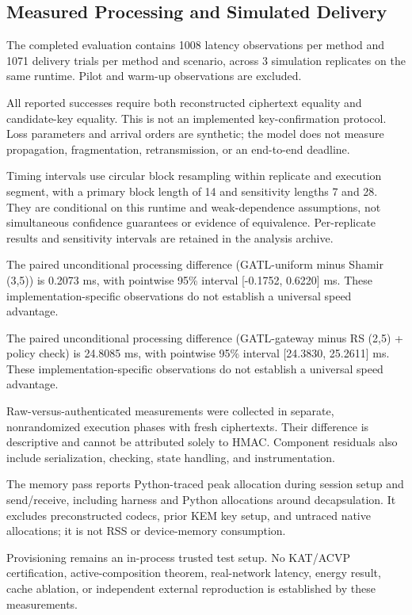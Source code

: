\subsection{Measured Processing and Simulated Delivery}

The completed evaluation contains 1008 latency observations per method and 1071 delivery trials per method and scenario, across 3 simulation replicates on the same runtime. Pilot and warm-up observations are excluded.

All reported successes require both reconstructed ciphertext equality and candidate-key equality. This is not an implemented key-confirmation protocol. Loss parameters and arrival orders are synthetic; the model does not measure propagation, fragmentation, retransmission, or an end-to-end deadline.



Timing intervals use circular block resampling within replicate and execution segment, with a primary block length of 14 and sensitivity lengths 7 and 28. They are conditional on this runtime and weak-dependence assumptions, not simultaneous confidence guarantees or evidence of equivalence. Per-replicate results and sensitivity intervals are retained in the analysis archive.

The paired unconditional processing difference (GATL-uniform minus Shamir (3,5)) is 0.2073 ms, with pointwise 95\% interval [-0.1752, 0.6220] ms. These implementation-specific observations do not establish a universal speed advantage.

The paired unconditional processing difference (GATL-gateway minus RS (2,5) + policy check) is 24.8085 ms, with pointwise 95\% interval [24.3830, 25.2611] ms. These implementation-specific observations do not establish a universal speed advantage.

Raw-versus-authenticated measurements were collected in separate, nonrandomized execution phases with fresh ciphertexts. Their difference is descriptive and cannot be attributed solely to HMAC. Component residuals also include serialization, checking, state handling, and instrumentation.

The memory pass reports Python-traced peak allocation during session setup and send/receive, including harness and Python allocations around decapsulation. It excludes preconstructed codecs, prior KEM key setup, and untraced native allocations; it is not RSS or device-memory consumption.

Provisioning remains an in-process trusted test setup. No KAT/ACVP certification, active-composition theorem, real-network latency, energy result, cache ablation, or independent external reproduction is established by these measurements.

